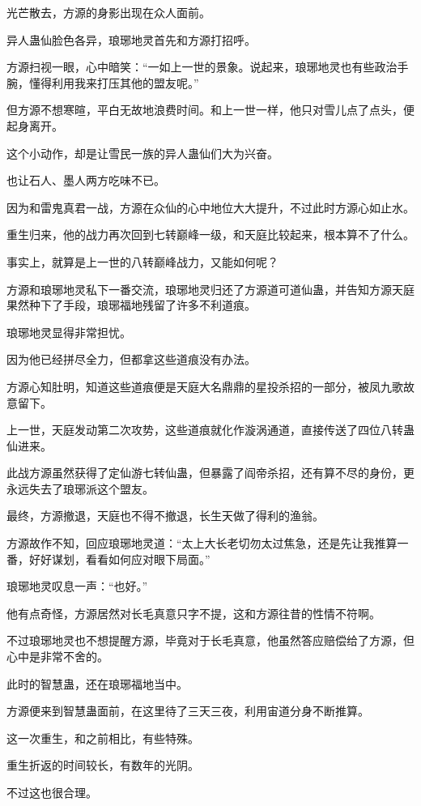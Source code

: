 \begin{this_body}
光芒散去，方源的身影出现在众人面前。

异人蛊仙脸色各异，琅琊地灵首先和方源打招呼。

方源扫视一眼，心中暗笑：“一如上一世的景象。说起来，琅琊地灵也有些政治手腕，懂得利用我来打压其他的盟友呢。”

但方源不想寒暄，平白无故地浪费时间。和上一世一样，他只对雪儿点了点头，便起身离开。

这个小动作，却是让雪民一族的异人蛊仙们大为兴奋。

也让石人、墨人两方吃味不已。

因为和雷鬼真君一战，方源在众仙的心中地位大大提升，不过此时方源心如止水。

重生归来，他的战力再次回到七转巅峰一级，和天庭比较起来，根本算不了什么。

事实上，就算是上一世的八转巅峰战力，又能如何呢？

方源和琅琊地灵私下一番交流，琅琊地灵归还了方源道可道仙蛊，并告知方源天庭果然种下了手段，琅琊福地残留了许多不利道痕。

琅琊地灵显得非常担忧。

因为他已经拼尽全力，但都拿这些道痕没有办法。

方源心知肚明，知道这些道痕便是天庭大名鼎鼎的星投杀招的一部分，被凤九歌故意留下。

上一世，天庭发动第二次攻势，这些道痕就化作漩涡通道，直接传送了四位八转蛊仙进来。

此战方源虽然获得了定仙游七转仙蛊，但暴露了阎帝杀招，还有算不尽的身份，更永远失去了琅琊派这个盟友。

最终，方源撤退，天庭也不得不撤退，长生天做了得利的渔翁。

方源故作不知，回应琅琊地灵道：“太上大长老切勿太过焦急，还是先让我推算一番，好好谋划，看看如何应对眼下局面。”

琅琊地灵叹息一声：“也好。”

他有点奇怪，方源居然对长毛真意只字不提，这和方源往昔的性情不符啊。

不过琅琊地灵也不想提醒方源，毕竟对于长毛真意，他虽然答应赔偿给了方源，但心中是非常不舍的。

此时的智慧蛊，还在琅琊福地当中。

方源便来到智慧蛊面前，在这里待了三天三夜，利用宙道分身不断推算。

这一次重生，和之前相比，有些特殊。

重生折返的时间较长，有数年的光阴。

不过这也很合理。


\end{this_body}
